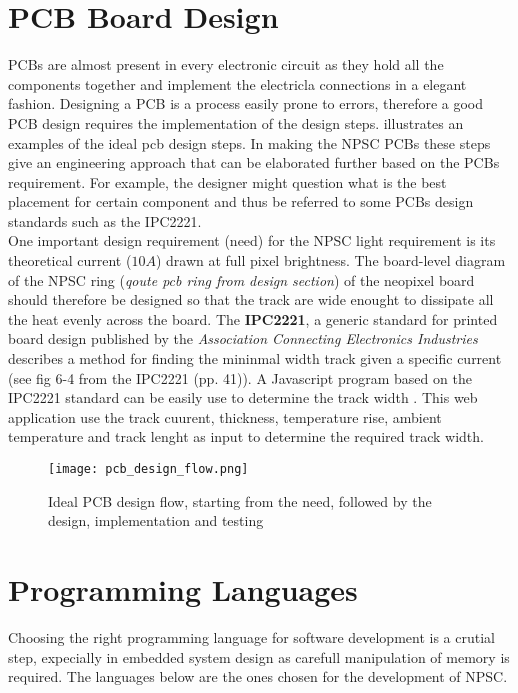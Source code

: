 \section{PCB Board Design}
PCBs are almost present in every electronic circuit as they hold all the components together and implement the electricla connections in a elegant fashion. Designing a PCB is a process easily prone to errors, therefore a good PCB design requires the implementation of the design steps.  illustrates an examples of the ideal pcb design steps. In making the NPSC PCBs these steps give an engineering approach that can be elaborated further based on the PCBs requirement. For example, the designer might question what is the best placement for certain component and thus be referred to some PCBs design standards such as the IPC2221.\\
One important design requirement (need) for the NPSC light requirement is its theoretical current ($10A$) drawn at full pixel brightness. The board-level diagram of the NPSC ring (\textit{qoute pcb ring from design section}) of the neopixel board should therefore be designed so that the track are wide enought to dissipate all the heat evenly across the board. The \textbf{IPC2221}, a generic standard for printed board design published by the \textit{Association Connecting Electronics Industries} \cite{pcb_design} describes a method for finding the mininmal width track given a specific current (see fig 6-4 from the IPC2221 \cite{pcb_design}(pp. 41)). A Javascript program based on the IPC2221 standard can be easily use to determine the track width \cite{pcb_track_width}. This web application use the track cuurent, thickness, temperature rise, ambient temperature and track lenght as input to determine the required track width.      
\begin{figure}[ht]
\centering
\texttt{[image: pcb\_design\_flow.png]}
\caption{Ideal PCB design flow, starting from the need, followed by the design, implementation and testing}
\label{fig:pcb_design_flow}
\end{figure}

\section{Programming Languages}
Choosing the right programming language for software development is a crutial step, expecially in embedded system design as carefull manipulation of memory is required. The languages below are the ones chosen for the development of NPSC. 
